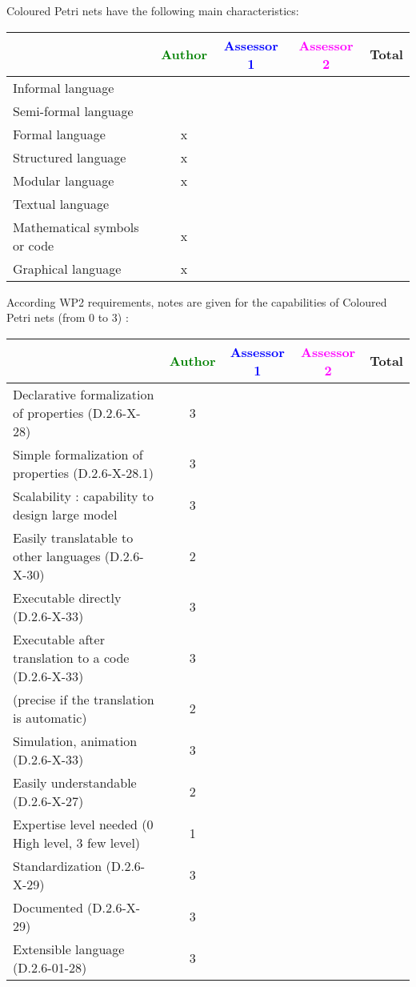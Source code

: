 Coloured Petri nets have the following main characteristics:

\begin{tabular}{|l | c | c | c | c|}
\hline
& \textcolor{green}{Author} & \textcolor{blue}{Assessor 1} & \textcolor{magenta}{Assessor 2} & Total \\
\hline 
Informal language & & & &  \\
\hline 
Semi-formal language & & & &  \\
\hline
Formal language & x & & &  \\
\hline
Structured language & x & & & \\
\hline
Modular language & x & & & \\
\hline
Textual language & & & & \\
\hline
Mathematical symbols or code & x & & & \\
\hline
Graphical language & x & & & \\
\hline
\end{tabular}

According WP2 requirements, notes are given for the capabilities of Coloured Petri nets (from 0 to 3) :

\begin{tabular}{|l | c | c | c | c|}
\hline
& \textcolor{green}{Author} & \textcolor{blue}{Assessor 1} & \textcolor{magenta}{Assessor 2} & Total \\
\hline
Declarative formalization of properties (D.2.6-X-28) & 3 & & & \\
\hline
Simple formalization of properties (D.2.6-X-28.1) & 3 & & & \\
\hline
Scalability : capability to design large model & 3 & & & \\
\hline
Easily translatable to other languages (D.2.6-X-30) & 2 & & & \\
\hline
Executable directly (D.2.6-X-33) & 3 & & & \\
\hline
Executable after translation to a code (D.2.6-X-33) & 3 & & & \\
(precise if the translation is automatic) & 2 & & & \\
\hline
Simulation, animation (D.2.6-X-33) & 3 & & & \\
\hline
Easily understandable (D.2.6-X-27) & 2 & & & \\
\hline
Expertise level needed (0 High level, 3 few level) & 1 & & & \\
\hline
Standardization (D.2.6-X-29) & 3 & & & \\
\hline
Documented (D.2.6-X-29) & 3 & & & \\
\hline
Extensible language (D.2.6-01-28) & 3 & & & \\
\hline
\end{tabular}


